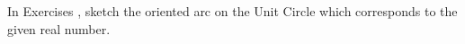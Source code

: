 {\noindent In Exercises}
{, sketch the oriented arc on the Unit Circle which  corresponds to the given real number. }
